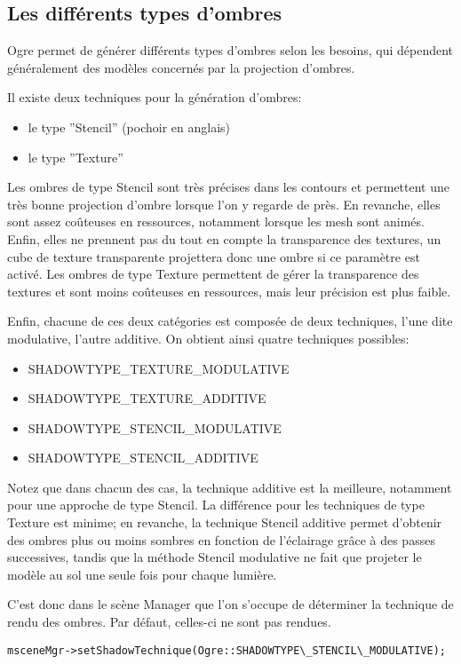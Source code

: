 \subsection{Les diff\'erents types d'ombres}

Ogre permet de g\'en\'erer diff\'erents types d'ombres selon les besoins, qui d\'ependent g\'en\'eralement des mod\`eles concern\'es par la projection d'ombres.

Il existe deux techniques pour la g\'en\'eration d'ombres:
\begin{itemize}
\item le type ''Stencil'' (pochoir en anglais)
\item le type ''Texture''
\end{itemize}

Les ombres de type Stencil sont tr\`es pr\'ecises dans les contours et permettent une tr\`es bonne projection d'ombre lorsque l'on y regarde de pr\`es. En revanche, elles sont assez co\^uteuses en ressources, notamment lorsque les mesh sont anim\'es. Enfin, elles ne prennent pas du tout en compte la transparence des textures, un cube de texture transparente projettera donc une ombre si ce param\`etre est activ\'e.
Les ombres de type Texture permettent de g\'erer la transparence des textures et sont moins co\^uteuses en ressources, mais leur pr\'ecision est plus faible.

Enfin, chacune de ces deux cat\'egories est compos\'ee de deux techniques, l'une dite modulative, l'autre additive. On obtient ainsi quatre techniques possibles:
\begin{itemize}
\item SHADOWTYPE\_TEXTURE\_MODULATIVE
\item SHADOWTYPE\_TEXTURE\_ADDITIVE
\item SHADOWTYPE\_STENCIL\_MODULATIVE
\item SHADOWTYPE\_STENCIL\_ADDITIVE
\end{itemize}


Notez que dans chacun des cas, la technique additive est la meilleure, notamment pour une approche de type Stencil. La diff\'erence pour les techniques de type Texture est minime; en revanche, la technique Stencil additive permet d'obtenir des ombres plus ou moins sombres en fonction de l'\'eclairage gr\^{a}ce \`{a} des passes successives, tandis que la m\'ethode Stencil modulative ne fait que projeter le mod\`ele au sol une seule fois pour chaque lumi\`ere.

C'est donc dans le sc\`ene Manager que l'on s'occupe de d\'eterminer la technique de rendu des ombres. Par d\'efaut, celles-ci ne sont pas rendues.
\begin{lstlisting}
msceneMgr->setShadowTechnique(Ogre::SHADOWTYPE\_STENCIL\_MODULATIVE);
\end{lstlisting}


